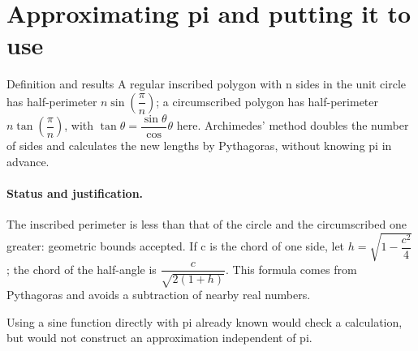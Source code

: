 \section{Approximating pi and putting it to use}\label{C10-U5}
\begin{repere}{Definition and results}
A regular inscribed polygon with n sides in the unit circle has half-perimeter $n\sin (\dfrac{\pi}{n})$; a circumscribed polygon has half-perimeter $n\tan (\dfrac{\pi}{n})$, with $\tan \theta =\dfrac{\sin \theta}{\cos}\theta $ here. Archimedes' method doubles the number of sides and calculates the new lengths by Pythagoras, without knowing pi in advance.
\end{repere}
\paragraph{Status and justification.} The inscribed perimeter is less than that of the circle and the circumscribed one greater: geometric bounds accepted. If c is the chord of one side, let $h=\sqrt {1-\dfrac{c^2}{4}}$; the chord of the half-angle is $\dfrac{c}{\sqrt {2(1+h)}}$. This formula comes from Pythagoras and avoids a subtraction of nearby real numbers.
\label{C10-EX5}
\clearpage
\begin{erreur}Using a sine function directly with pi already known would check a calculation, but would not construct an approximation independent of pi.\end{erreur}
\label{C10-AP5}
